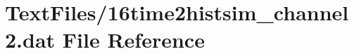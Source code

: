 \hypertarget{16time2histsim__channel2_8dat}{}\section{Text\+Files/16time2histsim\+\_\+channel2.dat File Reference}
\label{16time2histsim__channel2_8dat}
